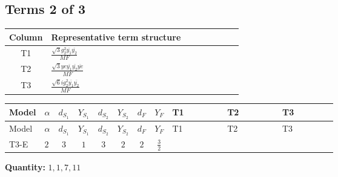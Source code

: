 \documentclass[8pt]{article}
\begin{document}
\begin{landscape}
\subsection*{Terms 2 of 3}
\begin{center}
\begin{tabular}{@{}c >{\raggedright\arraybackslash}p{0.82\linewidth}@{}}
\toprule
Column & Representative term structure \\
\midrule
T1 & \(\displaystyle \frac{\sqrt{3} g_{2}^{2} \overline{y_{1}} \overline{y_{2}}}{MF}\) \\
\midrule
T2 & \(\displaystyle \frac{\sqrt{3} ye \overline{y_{1}} \overline{y_{2}} \overline{ye}}{MF}\) \\
\midrule
T3 & \(\displaystyle \frac{\sqrt{6} i g_{2}^{2} \overline{y_{1}} \overline{y_{2}}}{MF}\) \\
\midrule
\bottomrule
\end{tabular}
\end{center}
\smallskip
\tiny
\begin{longtable}{@{}llcccccc >{\raggedright\arraybackslash}p{0.21\linewidth} >{\raggedright\arraybackslash}p{0.21\linewidth} >{\raggedright\arraybackslash}p{0.21\linewidth}@{}}
\toprule
Model & $\alpha$ & $d_{S_1}$ & $Y_{S_1}$ & $d_{S_2}$ & $Y_{S_2}$ & $d_F$ & $Y_F$ & T1 & T2 & T3 \\
\midrule
\endfirsthead
\toprule
Model & $\alpha$ & $d_{S_1}$ & $Y_{S_1}$ & $d_{S_2}$ & $Y_{S_2}$ & $d_F$ & $Y_F$ & T1 & T2 & T3 \\
\midrule
\endhead
T3-E & $2$ & $3$ & $1$ & $3$ & $2$ & $2$ & $\frac{3}{2}$ & \scriptsize\adjustbox{max width=\linewidth}{$\begin{gathered} \frac{49 \sqrt{3} g_{2}^{2} \overline{y_{1}} \overline{y_{2}}}{24 MF}\end{gathered}$} & \scriptsize\adjustbox{max width=\linewidth}{$\begin{gathered} - \frac{\sqrt{3} ye \overline{y_{1}} \overline{y_{2}} \overline{ye}}{12 MF}\end{gathered}$} & \scriptsize\adjustbox{max width=\linewidth}{$\begin{gathered} \frac{\sqrt{6} i g_{2}^{2} \overline{y_{1}} \overline{y_{2}}}{3 MF}\end{gathered}$} \\
\midrule
\bottomrule
\end{longtable}
\clearpage
\noindent\textbf{Quantity: }$\mathrm{1,1,7,11}$\par\smallskip

\end{landscape}
\end{document}
